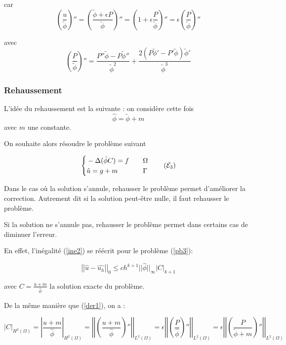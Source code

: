 car
$$\left(\frac{u}{\tilde{\phi}}\right)''=\left(\frac{\tilde{\phi}+\epsilon P}{\tilde{\phi}}\right)''=\left(1+\epsilon\frac{P}{\tilde{\phi}}\right)''=\epsilon\left(\frac{P}{\tilde{\phi}}\right)''$$

avec
$$\left(\frac{P}{\tilde{\phi}}\right)''=\frac{P''\tilde{\phi}-P\tilde{\phi}''}{\tilde{\phi}^2}+\frac{2(P\tilde{\phi}'-P'\tilde{\phi})\tilde{\phi}'}{\tilde{\phi}^3}$$

\subsubsection*{Rehaussement}

L'idée du rehaussement est la suivante : on considère cette fois
$$\hat{\phi}=\tilde{\phi}+m$$
avec $m$ une constante.

On souhaite alors résoudre le problème suivant

\begin{equation}
	\left\{\begin{aligned}
		&-\Delta (\hat{\phi}C)=f \quad &&\Omega \\
		&\hat{u}=g+m \quad &&\Gamma
	\end{aligned}\right. \label{pb3} \tag{$\mathcal{E}_3$}
\end{equation}

Dans le cas où la solution s'annule, rehausser le problème permet d'améliorer la correction. Autrement dit si la solution peut-être nulle, il faut rehausser le problème.

Si la solution ne s'annule pas, rehausser le problème permet dans certains cas de diminuer l'erreur.

En effet, l'inégalité (\ref{ine2}) se réécrit pour le problème (\ref{pb3}):

\begin{equation}
	\left|\left|\hat{u}-\hat{u_h}\right|\right|_0\le ch^{k+1}||\hat{\phi}||_\infty\left|C\right|_{k+1}
	\label{ine3}
\end{equation}

avec $C=\frac{u+m}{\hat{\phi}}$ la solution exacte du problème.

De la même manière que (\ref{der1}), on a :

\begin{equation}
	|C|_{H^2(\Omega)}=\left|\frac{u+m}{\hat{\phi}}\right|_{H^2(\Omega)}=\left|\left|\left(\frac{u+m}{\hat{\phi}}\right)''\right|\right|_{L^2(\Omega)}=\epsilon\left|\left|\left(\frac{P}{\hat{\phi}}\right)''\right|\right|_{L^2(\Omega)}=\epsilon\left|\left|\left(\frac{P}{\tilde{\phi}+m}\right)''\right|\right|_{L^2(\Omega)} \label{der2}
\end{equation}

